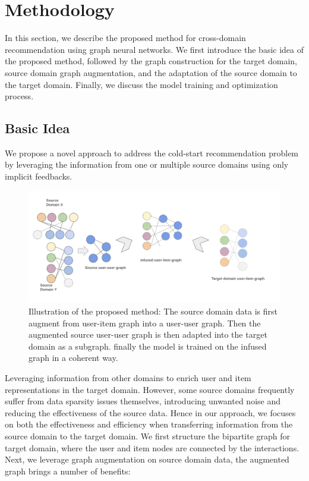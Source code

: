 \section{Methodology}

In this section, we describe the proposed method for cross-domain recommendation using graph neural networks.
We first introduce the basic idea of the proposed method, followed by the graph construction for the target domain, source domain graph augmentation, and the adaptation of the source domain to the target domain. Finally, we discuss the model training and optimization process.


\subsection{Basic Idea}

We propose a novel approach to address the cold-start recommendation problem by leveraging the information from one or multiple source domains using only implicit feedbacks.

\begin{figure}
    \centering
    \includegraphics[width=1\textwidth]{figs/multi-graph-fusion.png}
    \caption{Illustration of the proposed method: The source domain data is first augment from user-item graph into a user-user graph. Then the augmented source user-user graph is then adapted into the target domain as a subgraph. finally the model is trained on the infused graph in a coherent way.}
    \label{fig:source-target-transfer}
\end{figure}

Leveraging information from other domains to enrich user and item representations in the target domain. However, some source domains frequently suffer from data sparsity issues themselves, introducing unwanted noise and reducing the effectiveness of the source data. Hence in our approach, we focuses on both the effectiveness and efficiency when transferring information from the source domain to the target domain. We first structure the bipartite graph for target domain, where the user and item nodes are connected by the interactions. Next, we leverage graph augmentation on source domain data, the augmented graph brings a number of benefits:

